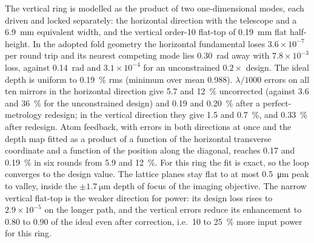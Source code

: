 \documentclass[11pt]{article}
\begin{document}
The vertical ring is modelled as the product of two one-dimensional modes, each driven and locked
separately: the horizontal direction with the telescope and a \SI{6.9}{\milli\metre} equivalent width,
and the vertical order-10 flat-top of \SI{0.19}{\milli\metre} flat half-height. In the adopted fold
geometry the horizontal fundamental loses $3.6\times10^{-7}$ per round trip and its nearest competing
mode lies \SI{0.30}{\radian} away with $7.8\times10^{-3}$ loss, against \SI{0.14}{\radian} and
$3.1\times10^{-4}$ for an unconstrained $0.2\times$ design. The ideal depth is uniform to
\SI{0.19}{\percent} rms (minimum over mean 0.988). $\lambda/1000$ errors on all ten mirrors in the
horizontal direction give 5.7 and \SI{12}{\percent} uncorrected (against 3.6 and \SI{36}{\percent} for
the unconstrained design) and 0.19 and \SI{0.20}{\percent} after a perfect-metrology redesign; in the
vertical direction they give 1.5 and \SI{0.7}{\percent}, and \SI{0.33}{\percent} after redesign. Atom
feedback, with errors in both directions at once and the depth map fitted as a product of a function
of the horizontal transverse coordinate and a function of the position along the diagonal, reaches 0.17
and \SI{0.19}{\percent} in six rounds from 5.9 and \SI{12}{\percent}. For this ring the fit is exact, so
the loop converges to the design value. The lattice planes stay flat to at most \SI{0.5}{\micro\metre}
peak to valley, inside the $\pm\SI{1.7}{\micro\metre}$ depth of focus of the imaging objective. The
narrow vertical flat-top is the weaker direction for power: its design loss rises to $2.9\times10^{-5}$
on the longer path, and the vertical errors reduce its enhancement to 0.80 to 0.90 of the ideal even
after correction, i.e.\ 10 to \SI{25}{\percent} more input power for this ring.
\end{document}
